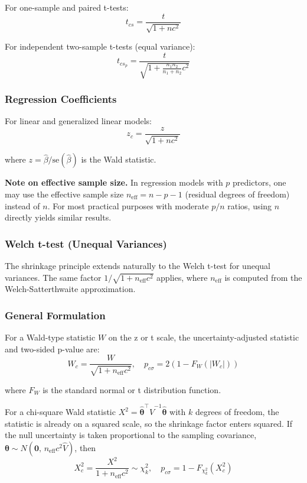 \documentclass[
  11pt,
  letterpaper,
]{article}
\begin{document}
For one-sample and paired t-tests:
\[t_{cs} = \dfrac{t}{\sqrt{1 + nc^2}}\]

For independent two-sample t-tests (equal variance):
\[t_{cs_p} = \dfrac{t}{\sqrt{1 + \frac{n_1 n_2}{n_1 + n_2} c^2}}\]

\subsubsection{Regression Coefficients}\label{regression-coefficients}

For linear and generalized linear models:
\[z_{c} = \dfrac{z}{\sqrt{1 + nc^2}}\]

where \(z = \hat{\beta}/\text{se}(\hat{\beta})\) is the Wald statistic.

\textbf{Note on effective sample size.} In regression models with \(p\)
predictors, one may use the effective sample size
\(n_{\text{eff}} = n - p - 1\) (residual degrees of freedom) instead of
\(n\). For most practical purposes with moderate \(p/n\) ratios, using
\(n\) directly yields similar results.

\subsubsection{Welch t-test (Unequal
Variances)}\label{welch-t-test-unequal-variances}

The shrinkage principle extends naturally to the Welch t-test for
unequal variances. The same factor \(1/\sqrt{1 + n_{\text{eff}}c^2}\)
applies, where \(n_{\text{eff}}\) is computed from the
Welch-Satterthwaite approximation.

\subsubsection{General Formulation}\label{general-formulation}

For a Wald-type statistic \(W\) on the z or t scale, the
uncertainty-adjusted statistic and two-sided p-value are:
\[W_{c} = \frac{W}{\sqrt{1 + n_{\text{eff}} c^2}}, \quad p_{c\sigma} = 2\left(1 - F_{W}(|W_c|)\right)\]

where \(F_W\) is the standard normal or t distribution function.

For a chi-square Wald statistic
\(X^2 = \hat{\boldsymbol\theta}^\top \hat{V}^{-1} \hat{\boldsymbol\theta}\)
with \(k\) degrees of freedom, the statistic is already on a squared
scale, so the shrinkage factor enters squared. If the null uncertainty
is taken proportional to the sampling covariance,
\(\boldsymbol\theta \sim N(\mathbf{0},\, n_{\text{eff}} c^2 \hat{V})\),
then
\[X^2_{c} = \frac{X^2}{1 + n_{\text{eff}} c^2} \sim \chi^2_k, \quad p_{c\sigma} = 1 - F_{\chi^2_k}(X^2_c)\]
\end{document}
